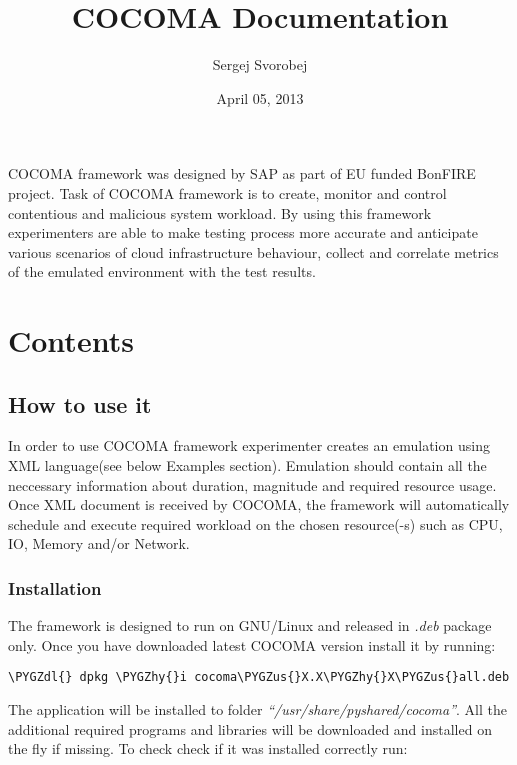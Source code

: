 \documentclass[letterpaper,10pt,english]{sphinxmanual}
\title{COCOMA Documentation}
\date{April 05, 2013}
\author{Sergej Svorobej}
\def\PYGZus{\char`\_}
\def\PYGZdl{\char`\$}
\def\PYGZhy{\char`\-}
\begin{document}
\maketitle
\tableofcontents
{}\label{index::doc}


COCOMA framework was designed by SAP as part of EU funded BonFIRE project. Task of COCOMA framework is
to create, monitor and control contentious and malicious system workload. By using
this framework experimenters are able to make testing process more accurate
and anticipate various scenarios of cloud infrastructure behaviour, collect and
correlate metrics of the emulated environment with the test results.


\chapter{Contents}
\label{index:controlled-contentious-and-malicious-cocoma-framework-1-0}\label{index:contents}

\section{How to use it}
\label{01_how_to_use_it:how-to-use-it}\label{01_how_to_use_it::doc}
In order to use COCOMA framework experimenter creates an emulation using XML language(see below Examples section). Emulation should contain all the neccessary information
about duration, magnitude and required resource usage. Once XML document is received by COCOMA, the framework will automatically schedule and execute
required workload on the chosen resource(-s) such as CPU, IO, Memory and/or Network.


\subsection{Installation}
\label{01_how_to_use_it:installation}
The framework is designed to run on GNU/Linux and released in \emph{.deb} package only.
Once you have downloaded latest COCOMA version install it by running:

\begin{Verbatim}[commandchars=\\\{\}]
\PYGZdl{} dpkg \PYGZhy{}i cocoma\PYGZus{}X.X\PYGZhy{}X\PYGZus{}all.deb
\end{Verbatim}

The application will be installed to folder \emph{``/usr/share/pyshared/cocoma''}. All the additional required programs and libraries will be downloaded and installed on the fly if missing.
To check check if it was installed correctly run:
\end{document}
